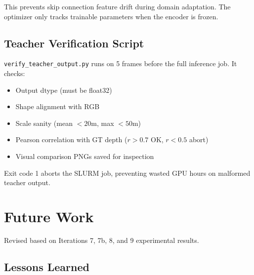 \documentclass[11pt,a4paper]{article}
\begin{document}
This prevents skip connection feature drift during domain adaptation.
The optimizer only tracks trainable parameters when the encoder is frozen.

\subsection{Teacher Verification Script}

\texttt{verify\_teacher\_output.py} runs on 5 frames before the full
inference job. It checks:
\begin{itemize}[nosep]
  \item Output dtype (must be float32)
  \item Shape alignment with RGB
  \item Scale sanity (mean $< 20$m, max $< 50$m)
  \item Pearson correlation with GT depth ($r > 0.7$ OK, $r < 0.5$ abort)
  \item Visual comparison PNGs saved for inspection
\end{itemize}

Exit code 1 aborts the SLURM job, preventing wasted GPU hours on
malformed teacher output.

\section{Future Work}
\label{sec:future}

Revised based on Iterations 7, 7b, 8, and 9 experimental results.

\subsection{Lessons Learned}
\end{document}
